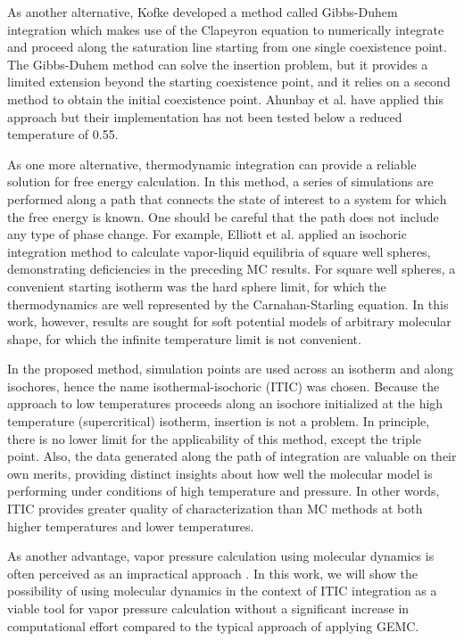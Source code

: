 \documentclass[%
 aip,
 jcp,
 sd,%
 amsmath,amssymb,
 reprint,%
]{revtex4-1}
\begin{document}
As another alternative, Kofke \cite{Kofke1993b} developed a method called Gibbs-Duhem integration which makes use of the Clapeyron equation to numerically integrate and proceed along the saturation line starting from one single coexistence point. The Gibbs-Duhem method can solve the insertion problem, but it provides a limited extension beyond the starting coexistence point, and it relies on a second method to obtain the initial coexistence point. Ahunbay et al. \cite{Ahunbay2004} have applied this approach but their implementation has not been tested below a reduced temperature of 0.55.

As one more alternative, thermodynamic integration can provide a reliable solution for free energy calculation. In this method, a series of simulations are performed along a path that connects the state of interest to a system for which the free energy is known. One should be careful that the path does not include any type of phase change. For example, Elliott et al. \cite{Elliott1999a} applied an isochoric integration method to calculate vapor-liquid equilibria of square well spheres, demonstrating deficiencies in the preceding MC results.  For square well spheres, a convenient starting isotherm was the hard sphere limit, for which the thermodynamics are well represented by the Carnahan-Starling equation\cite{Carnahan1969a}. In this work, however, results are sought for soft potential models of arbitrary molecular shape, for which the infinite temperature limit is not convenient. 

In the proposed method, simulation points are used across an isotherm and along isochores, hence the name isothermal-isochoric (ITIC) was chosen. Because the approach to low temperatures proceeds along an isochore initialized at the high temperature (supercritical) isotherm, insertion is not a problem. In principle, there is no lower limit for the applicability of this method, except the triple point. Also, the data generated along the path of integration are valuable on their own merits, providing distinct insights about how well the molecular model is performing under conditions of high temperature and pressure. In other words, ITIC provides greater quality of characterization than MC methods at both higher temperatures and lower temperatures.

As another advantage, vapor pressure calculation using molecular dynamics is often perceived as an impractical approach \cite{Nieto-Draghi2015}. In this work, we will show the possibility of using molecular dynamics in the context of ITIC integration as a viable tool for vapor pressure calculation without a significant increase in computational effort compared to the typical approach of applying GEMC.
 
\end{document}
